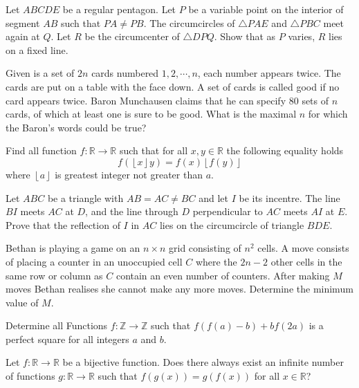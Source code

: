 \documentclass[11pt]{scrartcl}
\begin{document}
\begin{problem}[6020628633767269011]
Let \(ABCDE\) be a regular pentagon. Let \(P\) be a variable point on the interior of segment \(AB\) such that \(PA\ne PB\). The circumcircles of \(\triangle PAE\) and \(\triangle PBC\) meet again at \(Q\). Let \(R\) be the circumcenter of \(\triangle DPQ\). Show that as \(P\) varies, \(R\) lies on a fixed line.
\end{problem}
\begin{problem}[2989958142304279488]
Given is a set of $2n$ cards numbered $1,2, \cdots, n$, each number appears twice. The cards are put on a table with the face down. A set of cards is called good if no card appears twice. Baron Munchausen claims that he can specify $80$ sets of $n$ cards, of which at least one is sure to be good. What is the maximal $n$ for which the Baron's words could be true?
\end{problem}
\begin{problem}[8559783288978563338]
Find all function $f:\mathbb{R}\rightarrow\mathbb{R}$ such that for all $x,y\in\mathbb{R}$ the following equality holds\[
f(\left\lfloor x\right\rfloor y)=f(x)\left\lfloor f(y)\right\rfloor \]where $\left\lfloor a\right\rfloor $ is greatest integer not greater than $a.$
\end{problem}
\begin{problem}[567108152004136]
	Let $ABC$ be a triangle with $AB = AC \neq BC$ and let $I$ be its incentre. The line $BI$ meets $AC$ at $D$, and the line through $D$ perpendicular to $AC$ meets $AI$ at $E$. Prove that the reflection of $I$ in $AC$ lies on the circumcircle of triangle $BDE$.
\end{problem}
\begin{problem}[6702571883743406545]
Bethan is playing a game on an $n\times n$ grid consisting of $n^2$ cells. A move consists of placing a counter in an unoccupied cell $C$ where the $2n-2$ other cells in the same row or column as $C$ contain an even number of counters. After making $M$ moves Bethan realises she cannot make any more moves. Determine the minimum value of $M$.
\end{problem}
\begin{problem}[1053677942605812231]
	Determine all Functions $f:\mathbb{Z} \to \mathbb{Z}$ such that $f(f(a)-b)+bf(2a)$ is a perfect square for all integers $a$ and $b$.
\end{problem}
\begin{problem}[233001122289340]
Let $f:\mathbb{R}\to\mathbb{R}$ be a bijective function. Does there always exist an infinite number of functions $g:\mathbb{R}\to\mathbb{R}$ such that $f(g(x))=g(f(x))$ for all $x\in\mathbb{R}$?
\end{problem}
\end{document}

